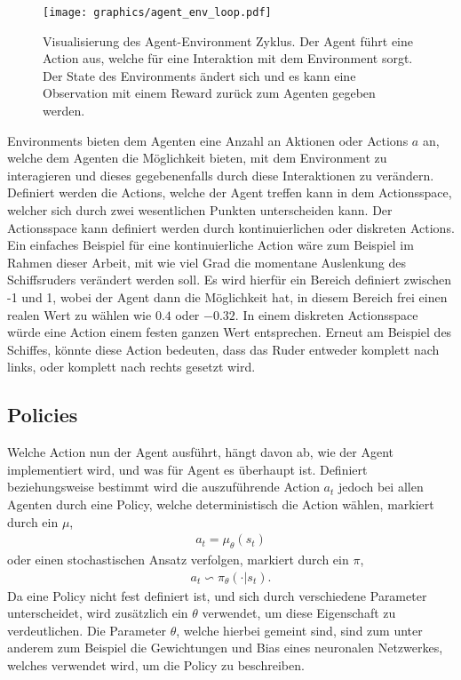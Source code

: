 \documentclass[]{iat}
\begin{document}
\begin{figure}[H]
    \texttt{[image: graphics/agent\_env\_loop.pdf]}
    \centering
    \caption{Visualisierung des Agent-Environment Zyklus. Der Agent führt eine Action aus, welche für eine Interaktion mit dem Environment sorgt. Der State des Environments ändert sich und es kann eine Observation mit einem Reward zurück zum Agenten gegeben werden.}
    \label{abb:agent_env_loop}
\end{figure}

Environments bieten dem Agenten eine Anzahl an Aktionen oder Actions $a$ an, welche dem Agenten die Möglichkeit bieten, mit dem Environment zu interagieren und dieses gegebenenfalls durch diese Interaktionen zu verändern. Definiert werden die Actions, welche der Agent treffen kann in dem Actionsspace, welcher sich durch zwei wesentlichen Punkten unterscheiden kann. Der Actionsspace kann definiert werden durch kontinuierlichen oder diskreten Actions. Ein einfaches Beispiel für eine kontinuierliche Action wäre zum Beispiel im Rahmen dieser Arbeit, mit wie viel Grad die momentane Auslenkung des Schiffsruders verändert werden soll. Es wird hierfür ein Bereich definiert zwischen -1 und 1, wobei der Agent dann die Möglichkeit hat, in diesem Bereich frei einen realen Wert zu wählen wie $0.4$ oder $-0.32$. In einem diskreten Actionsspace würde eine Action einem festen ganzen Wert entsprechen. Erneut am Beispiel des Schiffes, könnte diese Action bedeuten, dass das Ruder entweder komplett nach links, oder komplett nach rechts gesetzt wird.

\subsection{Policies}
Welche Action nun der Agent ausführt, hängt davon ab, wie der Agent implementiert wird, und was für Agent es überhaupt ist. Definiert beziehungsweise bestimmt wird die auszuführende Action $a_t$ jedoch bei allen Agenten durch eine Policy, welche deterministisch die Action wählen, markiert durch ein $\mu$,
\begin{align}
    a_t = \mu_\theta(s_t)
\end{align}
oder einen stochastischen Ansatz verfolgen, markiert durch ein $\pi$,
\begin{align}
    a_t \backsim \pi_\theta (\cdot | s_t).
\end{align}
Da eine Policy nicht fest definiert ist, und sich durch verschiedene Parameter unterscheidet, wird zusätzlich ein $\theta$ verwendet, um diese Eigenschaft zu verdeutlichen. Die Parameter $\theta$, welche hierbei gemeint sind, sind zum unter anderem zum Beispiel die Gewichtungen und Bias eines neuronalen Netzwerkes, welches verwendet wird, um die Policy zu beschreiben.
\end{document}
